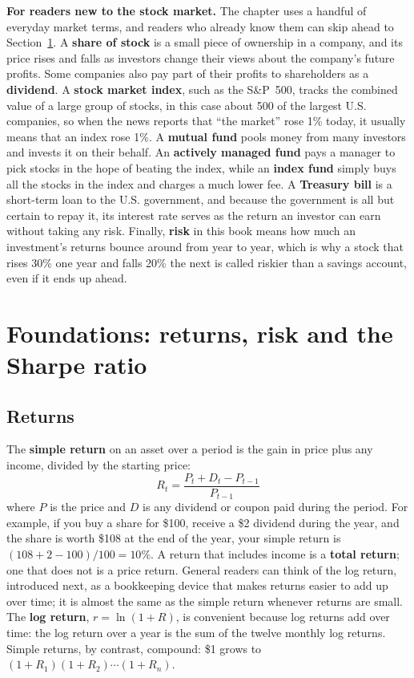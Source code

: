 \begin{callout}
\textbf{For readers new to the stock market.} The chapter uses a handful of everyday market terms, and readers who already know them can skip ahead to Section~\ref{sec:01-foundations}. A \textbf{share of stock} is a small piece of ownership in a company, and its price rises and falls as investors change their views about the company's future profits. Some companies also pay part of their profits to shareholders as a \textbf{dividend}. A \textbf{stock market index}, such as the S\&P~500, tracks the combined value of a large group of stocks, in this case about 500 of the largest U.S. companies, so when the news reports that ``the market'' rose 1\% today, it usually means that an index rose 1\%. A \textbf{mutual fund} pools money from many investors and invests it on their behalf. An \textbf{actively managed fund} pays a manager to pick stocks in the hope of beating the index, while an \textbf{index fund} simply buys all the stocks in the index and charges a much lower fee. A \textbf{Treasury bill} is a short-term loan to the U.S. government, and because the government is all but certain to repay it, its interest rate serves as the return an investor can earn without taking any risk. Finally, \textbf{risk} in this book means how much an investment's returns bounce around from year to year, which is why a stock that rises 30\% one year and falls 20\% the next is called riskier than a savings account, even if it ends up ahead.
\end{callout}



\section{Foundations: returns, risk and the Sharpe ratio}
\label{sec:01-foundations}

\subsection{Returns}

The \textbf{simple return} on an asset over a period is the gain in price plus any income, divided by the starting price:
\begin{equation}
  R_t = \frac{P_t + D_t - P_{t-1}}{P_{t-1}}
  \label{eq:01-return}
\end{equation}
where $P$ is the price and $D$ is any dividend or coupon paid during the period. For example, if you buy a share for \$100, receive a \$2 dividend during the year, and the share is worth \$108 at the end of the year, your simple return is $(108 + 2 - 100)/100 = 10$\%. A return that includes income is a \textbf{total return}; one that does not is a price return. General readers can think of the log return, introduced next, as a bookkeeping device that makes returns easier to add up over time; it is almost the same as the simple return whenever returns are small. The \textbf{log return}, $r = \ln(1 + R)$, is convenient because log returns add over time: the log return over a year is the sum of the twelve monthly log returns. Simple returns, by contrast, compound: \$1 grows to $(1 + R_1)(1 + R_2)\cdots(1 + R_n)$.

